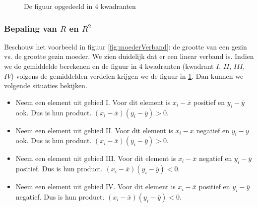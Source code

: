 
\begin{figure}[t]%
  \caption{De figuur opgedeeld in 4 kwadranten}%
  \label{fig:kwadranten}%
\end{figure}

\subsubsection{Bepaling van $R$ en $R^{2}$}
\label{sec:determinatiecoef}
Beschouw het voorbeeld in figuur \ref{fig:moederVerband}:  de grootte van een gezin vs. de grootte gezin moeder. We zien duidelijk dat er een linear verband is. Indien we de gemiddelde berekenen en de figuur in 4 kwadranten (kwadrant $I$, $II$, $III$, $IV$) volgens de gemiddelden verdelen krijgen we de figuur in \ref{fig:kwadranten}.  Dan kunnen we volgende situaties bekijken.

\begin{itemize}
  \item Neem een element uit gebied I. Voor dit element is $x_{i} - \overline{x}$ positief en $y_{i} - \overline{y}$ ook. Dus is hun product. $(x_{i} - \overline{x}) (y_{i} - \overline{y}) > 0$.
  \item Neem een element uit gebied II. Voor dit element is $x_{i} - \overline{x}$ negatief en $y_{i} - \overline{y}$ ook. Dus is hun product. $(x_{i} - \overline{x}) (y_{i} - \overline{y}) > 0$.
  \item Neem een element uit gebied III. Voor dit element is $x_{i} - \overline{x}$ negatief en $y_{i} - \overline{y}$ positief. Dus is hun product. $(x_{i} - \overline{x}) (y_{i} - \overline{y}) < 0$.
  \item Neem een element uit gebied IV. Voor dit element is $x_{i} - \overline{x}$ positief en $y_{i} - \overline{y}$ negatief. Dus is hun product. $(x_{i} - \overline{x}) (y_{i} - \overline{y}) < 0$.
\end{itemize}

